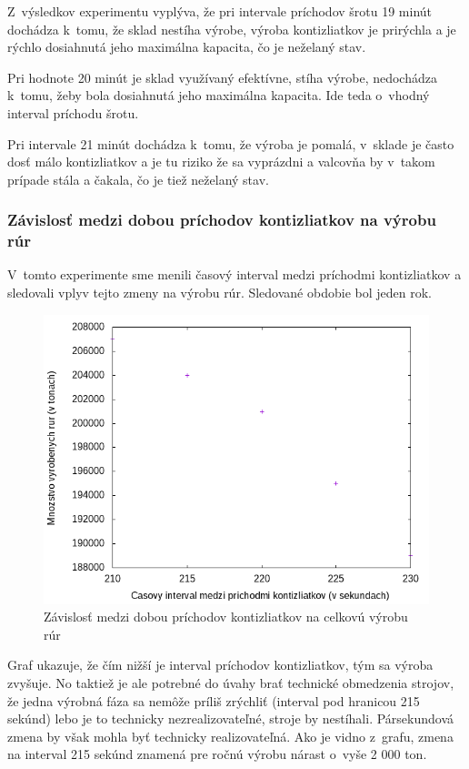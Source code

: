 \documentclass[]{article}
\begin{document}
Z~výsledkov experimentu vyplýva, že pri intervale príchodov šrotu 19 minút dochádza k~tomu, že sklad nestíha výrobe, výroba kontizliatkov je prirýchla a je rýchlo dosiahnutá jeho maximálna kapacita, čo je neželaný stav. 

Pri hodnote 20 minút je sklad využívaný efektívne, stíha výrobe, nedochádza k~tomu, žeby bola dosiahnutá jeho maximálna kapacita. Ide teda o~vhodný interval príchodu šrotu.

Pri intervale 21 minút dochádza k~tomu, že výroba je pomalá, v~sklade je často dosť málo kontizliatkov a je tu riziko že sa vyprázdni a valcovňa by v~takom prípade stála a čakala, čo je tiež neželaný stav.

\subsubsection{Závislosť medzi dobou príchodov kontizliatkov na výrobu rúr}
V~tomto experimente sme menili časový interval medzi príchodmi kontizliatkov a sledovali vplyv tejto zmeny na výrobu rúr. Sledované obdobie bol jeden rok.

\begin{figure}[h!]
	\includegraphics[width=\textwidth]{prichody_konti_rury.png}
	\caption{Závislosť medzi dobou príchodov kontizliatkov na celkovú výrobu rúr}
\end{figure}

Graf ukazuje, že čím nižší je interval príchodov kontizliatkov, tým sa výroba zvyšuje. No taktiež je ale potrebné do úvahy brať technické obmedzenia strojov, že jedna výrobná fáza sa nemôže príliš zrýchliť (interval pod hranicou 215 sekúnd) lebo je to technicky nezrealizovateľné, stroje by nestíhali. Pársekundová zmena by však mohla byť technicky realizovateľná. Ako je vidno z~grafu, zmena na interval 215 sekúnd znamená pre ročnú výrobu nárast o~vyše 2 000 ton. 
\end{document}
